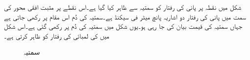 شکل  میں نقطہ  پر پانی کی رفتار کو سمتیہ  سے ظاہر کیا گیا ہے۔اس نقطے پر مثبت افقی محور کی سمت میں پانی کی رفتار دو اشاریہ پانچ میٹر فی سیکنڈ  ہے۔سمتیہ کی دُم اس مقام پر رکھی جاتی ہے جہاں سمتیہ کی قیمت بیان کی جا رہی ہو۔یوں شکل میں سمتیہ کی دُم   پر رکھی گئی ہے۔اس شکل میں  کی لمبائی  کی رفتار کو ظاہر کرتی ہے۔
\begin{comment}
\begin{figure}
\centering
\texttt{[image: vectorBaseAtPointOfAction]}
\caption{سمتیہ}
\label{شکل_سمتیہ_دم_پر_عمل_درآمد_ہوتی_ہے}
\end{figure}
\end{comment}
\begin{figure}
\centering
{}
\caption{سمتیہ}
\label{شکل_سمتیہ_دم_پر_عمل_درآمد_ہوتی_ہے}
\end{figure}


